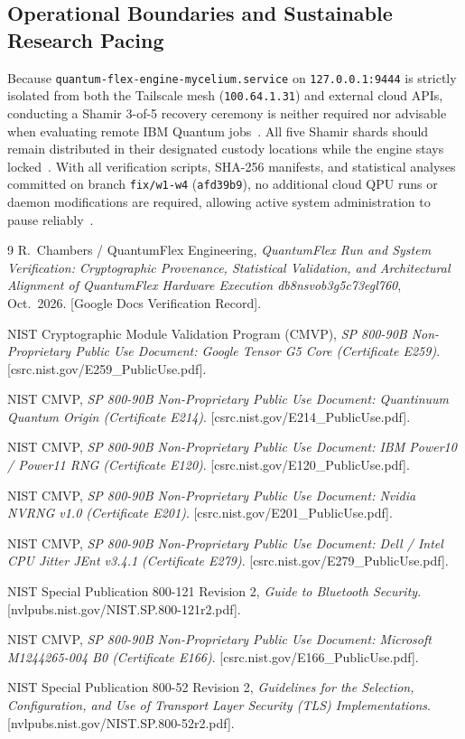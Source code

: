 \documentclass[10pt,letterpaper]{article}
\begin{document}
\subsection{Operational Boundaries and Sustainable Research Pacing}
Because \texttt{quantum-flex-engine-mycelium.service} on \texttt{127.0.0.1:9444} is strictly isolated from both the Tailscale mesh (\texttt{100.64.1.31}) and external cloud APIs, conducting a Shamir 3-of-5 recovery ceremony is neither required nor advisable when evaluating remote IBM Quantum jobs~\cite{qfx_doc}. All five Shamir shards should remain distributed in their designated custody locations while the engine stays locked~\cite{qfx_doc}. With all verification scripts, SHA-256 manifests, and statistical analyses committed on branch \texttt{fix/w1-w4} (\texttt{afd39b9}), no additional cloud QPU runs or daemon modifications are required, allowing active system administration to pause reliably~\cite{qfx_doc}.

\begin{thebibliography}{9}
R.~Chambers / QuantumFlex Engineering, \emph{QuantumFlex Run and System Verification: Cryptographic Provenance, Statistical Validation, and Architectural Alignment of QuantumFlex Hardware Execution db8nsvob3g5c73egl760}, Oct.\ 2026. [Google Docs Verification Record].

NIST Cryptographic Module Validation Program (CMVP), \emph{SP 800-90B Non-Proprietary Public Use Document: Google Tensor G5 Core (Certificate E259)}. [csrc.nist.gov/E259\_PublicUse.pdf].

NIST CMVP, \emph{SP 800-90B Non-Proprietary Public Use Document: Quantinuum Quantum Origin (Certificate E214)}. [csrc.nist.gov/E214\_PublicUse.pdf].

NIST CMVP, \emph{SP 800-90B Non-Proprietary Public Use Document: IBM Power10 / Power11 RNG (Certificate E120)}. [csrc.nist.gov/E120\_PublicUse.pdf].

NIST CMVP, \emph{SP 800-90B Non-Proprietary Public Use Document: Nvidia NVRNG v1.0 (Certificate E201)}. [csrc.nist.gov/E201\_PublicUse.pdf].

NIST CMVP, \emph{SP 800-90B Non-Proprietary Public Use Document: Dell / Intel CPU Jitter JEnt v3.4.1 (Certificate E279)}. [csrc.nist.gov/E279\_PublicUse.pdf].

NIST Special Publication 800-121 Revision 2, \emph{Guide to Bluetooth Security}. [nvlpubs.nist.gov/NIST.SP.800-121r2.pdf].

NIST CMVP, \emph{SP 800-90B Non-Proprietary Public Use Document: Microsoft M1244265-004 B0 (Certificate E166)}. [csrc.nist.gov/E166\_PublicUse.pdf].

NIST Special Publication 800-52 Revision 2, \emph{Guidelines for the Selection, Configuration, and Use of Transport Layer Security (TLS) Implementations}. [nvlpubs.nist.gov/NIST.SP.800-52r2.pdf].
\end{thebibliography}
\end{document}
